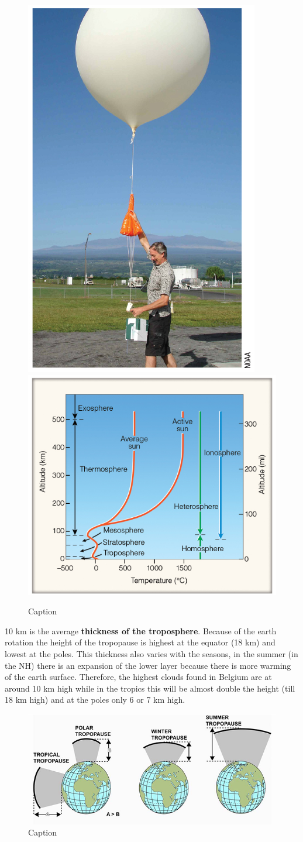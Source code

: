 \documentclass[oneside]{book}
\begin{document}
\begin{figure}

{\centering \includegraphics[width=0.4\linewidth]{figures/Figure14a} \includegraphics[width=0.4\linewidth]{figures/Figure14b} 

}

\caption{Caption}\label{fig:Homosphere}
\end{figure}

10 km is the average \textbf{thickness of the troposphere}. Because of
the earth rotation the height of the tropopause is highest at the
equator (18 km) and lowest at the poles. This thickness also varies with
the seasons, in the summer (in the NH) there is an expansion of the
lower layer because there is more warming of the earth surface.
Therefore, the highest clouds found in Belgium are at around 10 km high
while in the tropics this will be almost double the height (till 18 km
high) and at the poles only 6 or 7 km high.

\begin{figure}

{\centering \includegraphics[width=0.5\linewidth]{figures/Figure15} 

}

\caption{Caption}\label{fig:Thickness}
\end{figure}
\end{document}
